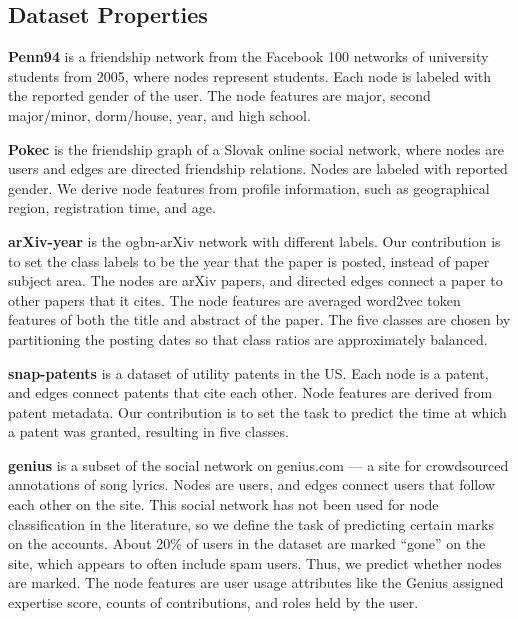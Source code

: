 \documentclass{article}
\newcommand{\myparagraph}[1]{\noindent \textbf{#1}}
\begin{document}
\subsection{Dataset Properties}\label{sec:dataset_properties}

\myparagraph{Penn94} \cite{traud2012social} is a friendship network from the Facebook 100 networks of university students from 2005, where nodes represent students. Each node is labeled with the reported gender of the user. The node features are major, second major/minor, dorm/house, year, and high school. 

\myparagraph{Pokec} \cite{snapnets} is the friendship graph of a Slovak online social network, where nodes are users and edges are directed friendship relations. Nodes are labeled with reported gender. We derive node features from profile information, such as geographical region, registration time, and age.

\myparagraph{arXiv-year} \cite{hu2020open} is the ogbn-arXiv network with different labels. Our contribution is to set the class labels to be  the year that the paper is posted, instead of paper subject area. The nodes are arXiv papers, and directed edges connect a paper to other papers that it cites. The node features are averaged word2vec token features of both the title and abstract of the paper. The five classes are chosen by partitioning the posting dates so that class ratios are approximately balanced.
    
\myparagraph{snap-patents} \cite{leskovec2005graphs, snapnets} is a dataset of utility patents in the US. Each node is a patent, and edges connect patents that cite each other. Node features are derived from patent metadata. 
Our contribution is to set the task to predict the time at which a patent was granted, resulting in five classes.


\myparagraph{genius} \cite{lim2021expertise} is a subset of the social network on genius.com --- a site for crowdsourced annotations of song lyrics. Nodes are users, and edges connect users that follow each other on the site. This social network has not been used for node classification in the literature, so we define the task of predicting certain marks on the accounts. About 20\% of users in the dataset are marked ``gone'' on the site, which appears to often include spam users. Thus, we predict whether nodes are marked. The node features are user usage attributes like the Genius assigned expertise score, counts of contributions, and roles held by the user.
\end{document}

